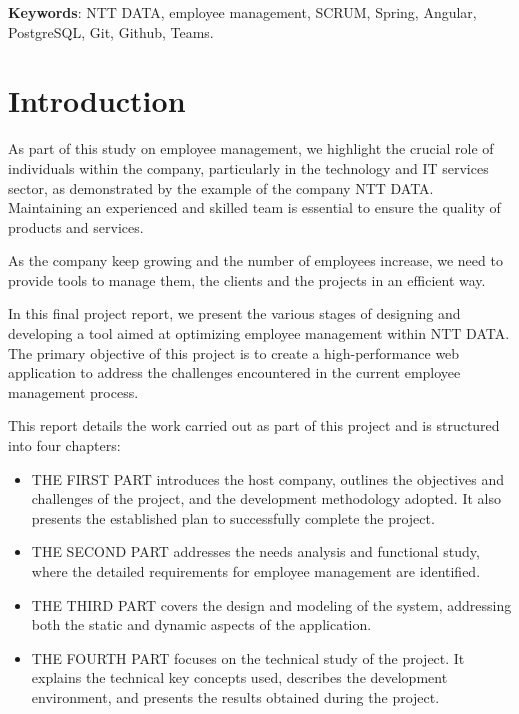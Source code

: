 \documentclass[12pt,a4paper,table,english]{article}
\begin{document}
	\textbf{Keywords}: NTT DATA, employee management, SCRUM, Spring, Angular,
	PostgreSQL, Git, Github, Teams.
	\pagebreak
	
	\tableofcontents
	\newpage
	
	
	\section {Introduction}
	As part of this study on employee management, we highlight the crucial role of individuals within the company, particularly in the technology and IT services sector, as demonstrated by the example of the company NTT DATA. Maintaining an experienced and skilled team is essential to ensure the quality of products and services.
	
	As the company keep growing and the number of employees increase, we need to provide tools to manage them, the clients and the projects in an efficient way. 
	
	In this final project report, we present the various stages of designing and developing a tool aimed at optimizing employee management within NTT DATA. The primary objective of this project is to create a high-performance web application to address the challenges encountered in the current employee management process.
	
	This report details the work carried out as part of this project and is structured into four chapters:
	
	\begin{itemize}
		\item THE FIRST PART introduces the host company, outlines the objectives and challenges of the project, and the development methodology adopted. It also presents the established plan to successfully complete the project.
	
		\item THE SECOND PART addresses the needs analysis and functional study, where the detailed requirements for employee management are identified.
	
		\item THE THIRD PART covers the design and modeling of the system, addressing both the static and dynamic aspects of the application.
	
		\item THE FOURTH PART focuses on the technical study of the project. It explains the technical key concepts used, describes the development environment, and presents the results obtained during the project.
	\end{itemize}
	
\end{document}

